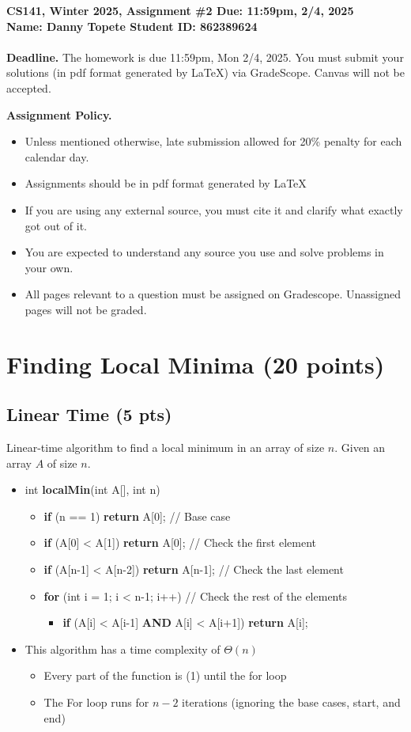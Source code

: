 \documentclass{article}[12pt]
\newcommand{\policy}[1]{#1}
\newcommand{\policy}[1]{}
\newcommand{\deadline}{11:59pm, 2/4, 2025}
\newcommand{\assigntitle}[1]{{
  \noindent \large \bf
  CS141, Winter 2025,
  Assignment \##1 \hfill Due: {\deadline}\\
  Name: Danny Topete %
  \hspace{2.5in}
  Student ID: 862389624 %
  \\
  [-.05in]
  \mbox{}\hrulefill \mbox{}\\}}
\begin{document}
\assigntitle{2}{}
\policy{\textbf{Deadline.} The homework is due 11:59pm, Mon 2/4, 2025. You must submit your solutions (in pdf
format generated by LaTeX) via GradeScope. Canvas will not be accepted.}\\
\date{}
\policy{\textbf{Assignment Policy.}
\begin{itemize}
    \item Unless mentioned otherwise, late submission allowed for 20\% penalty for each calendar day.
    \item Assignments should be in pdf format generated by LaTeX
    \item If you are using any external source, you must cite it and clarify what exactly got out of it.
    \item You are expected to understand any source you use and solve problems in your own.
    \item All pages relevant to a question must be assigned on Gradescope. Unassigned pages will not be graded.
\end{itemize}


}

\section{Finding Local Minima (20 points) }


\subsection{Linear Time (5 pts)}
Linear-time algorithm to find a local minimum in an array of size $n$.
Given an array $A$ of size $n$.
\begin{itemize}
  \item int \textbf{localMin}(int A[], int n)
    \begin{itemize}
      \item \textbf{if} (n == 1) \textbf{return} A[0]; // Base case
      \item \textbf{if} (A[0] < A[1]) \textbf{return} A[0]; // Check the first element
      \item \textbf{if} (A[n-1] < A[n-2]) \textbf{return} A[n-1]; // Check the last element
      \item \textbf{for} (int i = 1; i < n-1; i++) // Check the rest of the elements
        \begin{itemize}
          \item \textbf{if} (A[i] < A[i-1] \textbf{AND} A[i] < A[i+1]) \textbf{return} A[i];
        \end{itemize}
    \end{itemize}
  \item This algorithm has a time complexity of $\Theta(n)$
  \begin{itemize}
    \item Every part of the function is \Theta(1) until the for loop
    \item The For loop runs for $n-2$ iterations (ignoring the base cases, start, and end)
  \end{itemize}
\end{itemize}
\end{document}
